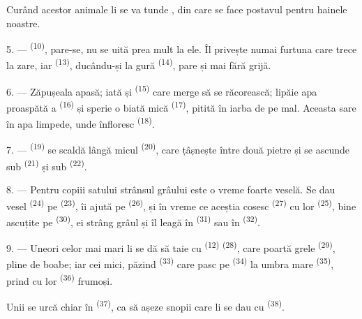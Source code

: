 Curând acestor animale li se va tunde , din care se face postavul
pentru hainele noastre.

\VUsaut{5.0mm}
\VUsaut{3.4mm}

5. ---  \textsuperscript{(10)}, pare-se, nu se uită prea mult la
ele. Îl privește numai furtuna care trece la zare, iar 
\textsuperscript{(13)}, ducându-și  la gură \textsuperscript{(14)},
pare și mai fără grijă.

6. --- Zăpușeala apasă; iată și  \textsuperscript{(15)} care merge
să se răcorească; lipăie apa proaspătă a  \textsuperscript{(16)}
și sperie o biată  mică \textsuperscript{(17)}, pitită în iarba de
pe mal. Aceasta sare în apa limpede, unde înfloresc 
\textsuperscript{(18)}.

7. ---  \textsuperscript{(19)} se scaldă lângă micul
 \textsuperscript{(20)}, care țâșnește între două pietre și se
ascunde sub  \textsuperscript{(21)} și sub
 \textsuperscript{(22)}.

\VUsaut{5.0mm}
\VUsaut{3.4mm}

8. --- Pentru copiii satului strânsul grâului este o vreme foarte veselă. Se dau
vesel  \textsuperscript{(24)} pe 
\textsuperscript{(23)}, îi ajută pe  \textsuperscript{(26)}, și
în vreme ce aceștia cosesc  \textsuperscript{(27)} cu
 lor \textsuperscript{(25)}, bine ascuțite pe 
\textsuperscript{(30)}, ei strâng grâul și îl leagă în 
\textsuperscript{(31)} sau în  \textsuperscript{(32)}.

9. --- Uneori celor mai mari li se dă să taie cu 
\textsuperscript{(12)}  \textsuperscript{(28)}, care poartă
 grele \textsuperscript{(29)}, pline de boabe; iar cei mici, păzind
 \textsuperscript{(33)} care pasc pe 
\textsuperscript{(34)} la umbra  mare \textsuperscript{(35)},
prind cu  lor \textsuperscript{(36)}  frumoși.

Unii se urcă chiar în  \textsuperscript{(37)}, ca să așeze snopii care
li se dau cu  \textsuperscript{(38)}.

